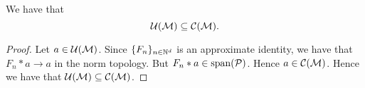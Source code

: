 \begin{proposition}
    We have that
    \begin{equation}
        \mathcal{U}(\mathcal{M}) \subseteq \mathcal{C}(\mathcal{M}).
    \end{equation}
\end{proposition}
\begin{proof}
    Let $a \in \mathcal{U}(\mathcal{M})$. Since $\{F_n\}_{n\in\mathbb{N}^d}$ is an approximate identity, we have
    that $F_n*a\rightarrow a$ in the norm topology. But $F_n*a \in \operatorname{span}(\mathcal{P})$.
    Hence $a \in \mathcal{C}(\mathcal{M})$. Hence we have that $\mathcal{U}(\mathcal{M}) \subseteq \mathcal{C}(\mathcal{M})$.
    

%    
%    
\end{proof}

